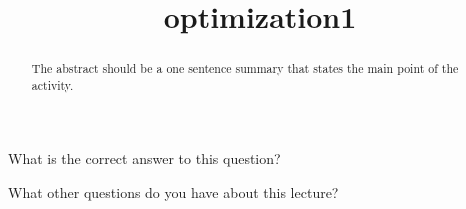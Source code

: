 \documentclass{ximera}
\title{optimization1}
\begin{document}
\begin{abstract}
  The abstract should be a one sentence summary that states the main point of the activity.
\end{abstract}

\maketitle

\begin{question}
  What is the correct answer to this question?

  
    \begin{multipleChoice}
    \end{multipleChoice}  
  
\end{question}

What other questions do you have about this lecture?
\begin{question}
  \begin{freeResponse}
  \end{freeResponse}
\end{question}
\end{document}
